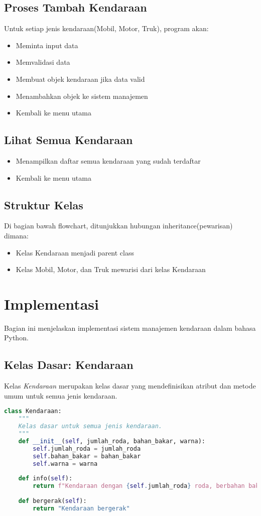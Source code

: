 \documentclass[12pt]{article}
\begin{document}
\subsection{Proses Tambah Kendaraan}
Untuk setiap jenis kendaraan(Mobil, Motor, Truk), program akan:
\begin{itemize}
    \item Meminta input data
    \item Memvalidasi data
    \item Membuat objek kendaraan jika data valid
    \item Menambahkan objek ke sistem manajemen
    \item Kembali ke menu utama
\end{itemize}
\subsection{Lihat Semua Kendaraan}
\begin{itemize}
    \item Menampilkan daftar semua kendaraan yang sudah terdaftar
    \item Kembali ke menu utama
\end{itemize}
\subsection{Struktur Kelas}
Di bagian bawah flowchart, ditunjukkan hubungan inheritance(pewarisan) dimana:
\begin{itemize}
    \item Kelas Kendaraan menjadi parent class
    \item Kelas Mobil, Motor, dan Truk mewarisi dari kelas Kendaraan
\end{itemize}
\section{Implementasi}
Bagian ini menjelaskan implementasi sistem manajemen kendaraan dalam bahasa Python.

\subsection{Kelas Dasar: Kendaraan}
Kelas \textit{Kendaraan} merupakan kelas dasar yang mendefinisikan atribut dan metode umum untuk semua jenis kendaraan.

\begin{lstlisting}[language=Python, caption=Implementasi Kelas Kendaraan]
class Kendaraan:
    """
    Kelas dasar untuk semua jenis kendaraan.
    """
    def __init__(self, jumlah_roda, bahan_bakar, warna):
        self.jumlah_roda = jumlah_roda
        self.bahan_bakar = bahan_bakar
        self.warna = warna
    
    def info(self):
        return f"Kendaraan dengan {self.jumlah_roda} roda, berbahan bakar {self.bahan_bakar}, berwarna {self.warna}"
    
    def bergerak(self):
        return "Kendaraan bergerak"
\end{lstlisting}
\end{document}
